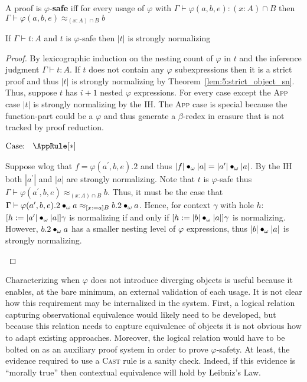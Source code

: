 \begin{definition}
    A proof is $\varphi$-\textbf{safe} iff for every usage of $\varphi$ with $\Gamma \vdash \varphi(a, b, e) : (x : A) \cap B$ then $\Gamma \vdash \varphi(a, b, e) \approx_{(x : A) \cap B} b$
\end{definition}

\begin{theorem}
    If $\Gamma \vdash t : A$ and $t$ is $\varphi$-safe then $|t|$ is strongly normalizing
\end{theorem}
\begin{proof}
    By lexicographic induction on the nesting count of $\varphi$ in $t$ and the inference judgment $\Gamma \vdash t : A$.
    If $t$ does not contain any $\varphi$ subexpressions then it is a strict proof and thus $|t|$ is strongly normalizing by Theorem~\ref{lem:5:strict_object_sn}.
    Thus, suppose $t$ has $i + 1$ nested $\varphi$ expressions.
    For every case except the \textsc{App} case $|t|$ is strongly normalizing by the IH.
    The \textsc{App} case is special because the function-part could be a $\varphi$ and thus generate a $\beta$-redex in erasure that is not tracked by proof reduction.

    $\text{Case: }\begin{array}{c} \AppRule[*] \end{array}$
    \begin{proofcase}
        Suppose wlog that $f = \varphi(a^\prime, b, e).2$ and thus $|f| \bullet_{\omega} |a| = |a^\prime| \bullet_{\omega} |a|$.
        By the IH both $|a^\prime|$ and $|a|$ are strongly normalizing.
        Note that $t$ is $\varphi$-safe thus $\Gamma \vdash \varphi(a^\prime, b, e) \approx_{(x : A) \cap B} b$.
        Thus, it must be the case that $\Gamma \vdash \varphi(a^\prime, b, e).2 \bullet_{\omega} a \approx_{[x := a]B} b.2 \bullet_{\omega} a$.
        Hence, for context $\gamma$ with hole $h$: $[h := |a^\prime| \bullet_{\omega} |a|]\gamma$ is normalizing if and only if $[h := |b| \bullet_{\omega} |a|]\gamma$ is normalizing.
        However, $b.2 \bullet_{\omega} a$ has a smaller nesting level of $\varphi$ expressions, thus $|b| \bullet_{\omega} |a|$ is strongly normalizing.
    \end{proofcase}
\end{proof}

Characterizing when $\varphi$ does not introduce diverging objects is useful because it enables, at the bare minimum, an external validation of each usage.
It is not clear how this requirement may be internalized in the system.
First, a logical relation capturing observational equivalence would likely need to be developed, but because this relation needs to capture equivalence of objects it is not obvious how to adapt existing approaches.
Moreover, the logical relation would have to be bolted on as an auxiliary proof system in order to prove $\varphi$-safety.
At least, the evidence required to use a \textsc{Cast} rule is a sanity check.
Indeed, if this evidence is ``morally true'' then contextual equivalence will hold by Leibniz's Law.

